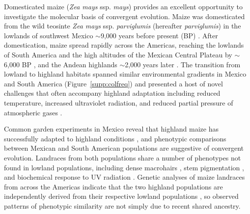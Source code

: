 

Domesticated maize (\emph{Zea mays} ssp. \emph{mays}) provides an excellent opportunity to investigate the molecular basis of convergent evolution.  
Maize was domesticated from the wild teosinte \emph{Zea mays} ssp. \emph{parviglumis} (hereafter \emph{parviglumis}) in the lowlands of southwest Mexico $\sim$9,000 years before present (BP) \cite[]{Matsuoka_2002_11983901,Piperno_2009_19307570,vanHeerwaarden_2011_21189301}. 
After domestication, maize spread rapidly across the Americas, reaching the lowlands of South America and the high altitudes of the Mexican Central Plateau by $\sim$6,000 BP \cite[]{Piperno_2006_69}, and the Andean highlands $\sim$2,000 years later \cite[]{Perry_2006_16511492,Grobman_2012_22307642}. 
The transition from lowland to highland habitats spanned similar environmental gradients in Mexico and South America (Figure~\ref{supp:colfreq}) and presented a host of novel challenges that often accompany highland adaptation including reduced temperature, increased ultraviolet radiation, and reduced partial pressure of atmospheric gases \cite[]{Korner_2007_17988759}.

Common garden experiments in Mexico reveal that highland maize has successfully adapted to highland conditions \cite[]{Mercer2008}, and phenotypic comparisons between Mexican and South American populations are suggestive of convergent evolution.  
Landraces from both populations share a number of phenotypes not found in lowland populations, including dense macrohairs \cite[]{Wilkes_1977,Wellhausen1957:book}, stem pigmentation \cite[]{Wilkes_1977,Wellhausen1957:book}, and biochemical response to UV radiation \cite[]{Casati2005}. 
Genetic analyses of maize landraces from across the Americas indicate that the two highland populations are independently derived from their respective lowland populations \cite[]{Vigouroux_2008_21632329, vanHeerwaarden_2011_21189301}, so observed patterns of phenotypic similarity are not simply due to recent shared ancestry. 

